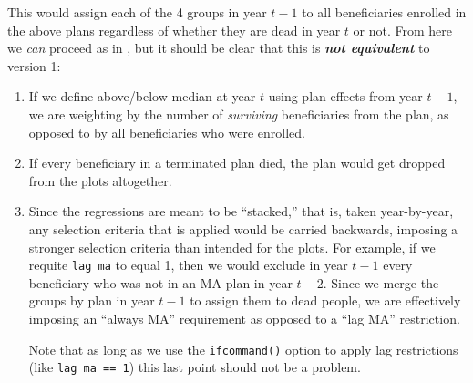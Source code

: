 \documentclass{article}
\begin{document}
This would assign each of the 4 groups in year $t - 1$ to all
beneficiaries enrolled in the above plans regardless of whether they
are dead in year $t$ or not. From here we \textit{can} proceed as in
, but it should be clear that this is
\textbf{\textit{not equivalent}} to version 1:
\begin{enumerate}

  \item If we define above/below median at year $t$ using plan
    effects from year $t - 1$, we are weighting by the number of
    \textit{surviving} beneficiaries from the plan, as opposed to
    by all beneficiaries who were enrolled.

  \item If every beneficiary in a terminated plan died, the plan would
    get dropped from the plots altogether.

  \item Since the regressions are meant to be ``stacked,'' that is,
    taken year-by-year, any selection criteria that is applied would
    be carried backwards, imposing a stronger selection criteria than
    intended for the plots. For example, if we requite \verb`lag ma` to
    equal 1, then we would exclude in year $t - 1$ every beneficiary who
    was not in an MA plan in year $t - 2$. Since we merge the groups
    by plan in year $t - 1$ to assign them to dead people, we are
    effectively imposing an ``always MA'' requirement as opposed to a
    ``lag MA'' restriction.

    Note that as long as we use the \verb`ifcommand()` option to
    apply lag restrictions (like \verb`lag ma == 1`) this last point
    should not be a problem.
\end{enumerate}

\end{document}
